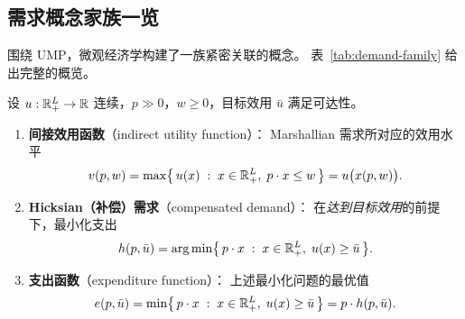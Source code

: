 
\subsection{需求概念家族一览}
\label{subsec:demand-family}

围绕 UMP，微观经济学构建了一族紧密关联的概念。
表~\ref{tab:demand-family} 给出完整的概览。

\begin{definition}\label{def:indirect-hicksian}
设 $u:\mathbb{R}^L_+\to\mathbb{R}$ 连续，$p\gg 0$，$w\ge 0$，目标效用 $\bar u$ 满足可达性。
\begin{enumerate}
\item \textbf{间接效用函数}（indirect utility function）：
  Marshallian 需求所对应的效用水平
  \[
    v(p,w)=\max\bigl\{\,u(x)\;:\;x\in\mathbb{R}^L_+,\;p\cdot x\le w\,\bigr\}
      = u\bigl(x(p,w)\bigr).
  \]
\item \textbf{Hicksian（补偿）需求}（compensated demand）：
  在\emph{达到目标效用}的前提下，最小化支出
  \[
    h(p,\bar u)=\arg\min\bigl\{\,p\cdot x\;:\;x\in\mathbb{R}^L_+,\;u(x)\ge\bar u\,\bigr\}.
  \]
\item \textbf{支出函数}（expenditure function）：
  上述最小化问题的最优值
  \[
    e(p,\bar u)=\min\bigl\{\,p\cdot x\;:\;x\in\mathbb{R}^L_+,\;u(x)\ge\bar u\,\bigr\}
      = p\cdot h(p,\bar u).
  \]
\end{enumerate}
\end{definition}

